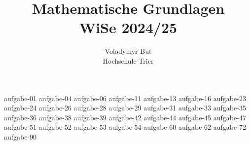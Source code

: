 \documentclass[10pt, oneside]{article}
\title{Mathematische Grundlagen\\[10pt]\Large{WiSe 2024/25}}
\author{Volodymyr But\\[10pt]Hochschule Trier}
\date{}
\begin{document}
\sloppy

\maketitle
\vspace{25px}

{aufgabe-01}
{aufgabe-04}
{aufgabe-06}
{aufgabe-11}
{aufgabe-13}
{aufgabe-16}
{aufgabe-23}
{aufgabe-24}
{aufgabe-26}
{aufgabe-28}
{aufgabe-29}
{aufgabe-31}
\pagebreak
{aufgabe-33}
\pagebreak
{aufgabe-35}
{aufgabe-36}
{aufgabe-38}
{aufgabe-39}
{aufgabe-42}
{aufgabe-44}
{aufgabe-45}
{aufgabe-47}
{aufgabe-51}
{aufgabe-52}
{aufgabe-53}
{aufgabe-54}
{aufgabe-60}
\pagebreak
{aufgabe-62}
{aufgabe-72}
{aufgabe-90}
\end{document}
